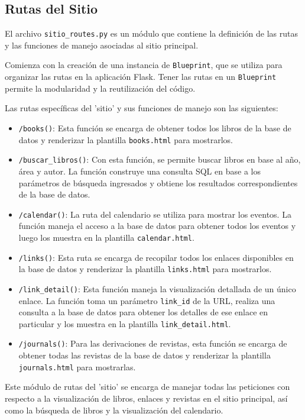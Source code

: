 \documentclass[a4paper, 12pt]{book}
\begin{document}
\subsection{Rutas del Sitio}
\label{sec:rutas_sitio}

El archivo \texttt{sitio\_routes.py} es un módulo que contiene la definición de las rutas y las funciones de manejo asociadas al sitio principal.

Comienza con la creación de una instancia de \texttt{Blueprint}, que se utiliza para organizar las rutas en la aplicación Flask. Tener las rutas en un \texttt{Blueprint} permite la modularidad y la reutilización del código.

Las rutas específicas del 'sitio' y sus funciones de manejo son las siguientes:

\begin{itemize}
    \item \texttt{/books()}: Esta función se encarga de obtener todos los libros de la base de datos y renderizar la plantilla \texttt{books.html} para mostrarlos.
    \item \texttt{/buscar\_libros()}: Con esta función, se permite buscar libros en base al año, área y autor. La función construye una consulta SQL en base a los 
    parámetros de búsqueda ingresados y obtiene los resultados correspondientes de la base de datos.
    \item \texttt{/calendar()}: La ruta del calendario se utiliza para mostrar los eventos. La función maneja el acceso a la base de datos para obtener todos los 
    eventos y luego los muestra en la plantilla \texttt{calendar.html}.
    \item \texttt{/links()}: Esta ruta se encarga de recopilar todos los enlaces disponibles en la base de datos y renderizar la plantilla \texttt{links.html} para mostrarlos.
    \item \texttt{/link\_detail()}: Esta función maneja la visualización detallada de un único enlace. La función toma un parámetro \texttt{link\_id} de la URL, 
    realiza una consulta a la base de datos para obtener los detalles de ese enlace en particular y los muestra en la plantilla \texttt{link\_detail.html}.
    \item \texttt{/journals()}: Para las derivaciones de revistas, esta función se encarga de obtener todas las revistas de la base de datos y renderizar la 
    plantilla \texttt{journals.html} para mostrarlas.
\end{itemize}

Este módulo de rutas del 'sitio' se encarga de manejar todas las peticiones con respecto a la visualización de libros, enlaces y revistas en el sitio principal, así como la búsqueda de libros y la visualización del calendario.
\end{document}
